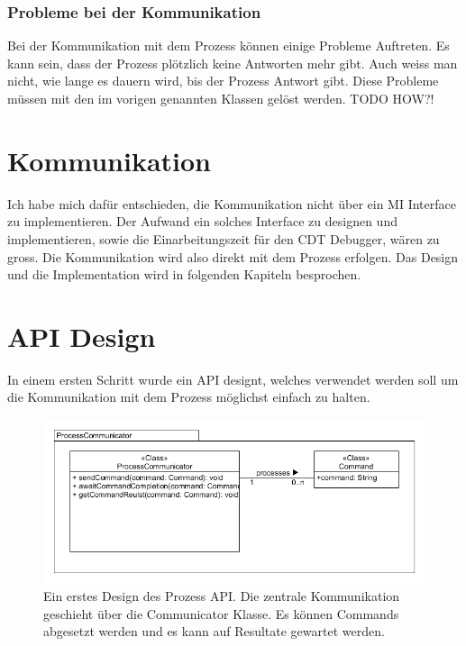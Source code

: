 \subsubsection{Probleme bei der Kommunikation}

Bei der Kommunikation mit dem Prozess können einige Probleme Auftreten. Es kann sein, dass der Prozess plötzlich keine Antworten mehr gibt. Auch weiss man nicht, wie lange es dauern wird, bis der Prozess Antwort gibt. Diese Probleme müssen mit den im vorigen genannten Klassen gelöst werden. TODO HOW?!

\section{Kommunikation}

Ich habe mich dafür entschieden, die Kommunikation nicht über ein MI Interface zu implementieren. Der Aufwand ein solches Interface zu designen und implementieren, sowie die Einarbeitungszeit für den CDT Debugger, wären zu gross. Die Kommunikation wird also direkt mit dem Prozess erfolgen. Das Design und die Implementation wird in folgenden Kapiteln besprochen.

\section{API Design}

In einem ersten Schritt wurde ein API designt, welches verwendet werden soll um die Kommunikation mit dem Prozess möglichst einfach zu halten.

\begin{figure}[H]
	\centering
		\includegraphics[scale=0.6]{forthcommunication/api.png}
		\caption{Ein erstes Design des Prozess API. Die zentrale Kommunikation geschieht über die Communicator Klasse. Es können Commands abgesetzt werden und es kann auf Resultate gewartet werden.}
		\label{fig:api}
\end{figure}

